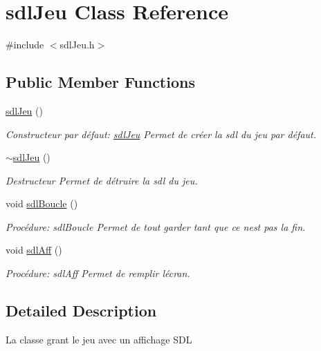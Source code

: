 \hypertarget{classsdlJeu}{}\section{sdl\+Jeu Class Reference}
\label{classsdlJeu}


{\ttfamily \#include $<$sdl\+Jeu.\+h$>$}

\subsection*{Public Member Functions}
\begin{DoxyCompactItemize}
\item 
\hyperlink{classsdlJeu_a06ba2075a4b592f6d0a2e268c29a044e}{sdl\+Jeu} ()
\begin{DoxyCompactList}\small\item\em Constructeur par défaut\+: \hyperlink{classsdlJeu}{sdl\+Jeu} Permet de créer la sdl du jeu par défaut. \end{DoxyCompactList}\item 
\mbox{\label{classsdlJeu_a5bcd8f5ed17a2cea2ad2fc633415cbcc}} 
\hyperlink{classsdlJeu_a5bcd8f5ed17a2cea2ad2fc633415cbcc}{$\sim$sdl\+Jeu} ()
\begin{DoxyCompactList}\small\item\em Destructeur Permet de détruire la sdl du jeu. \end{DoxyCompactList}\item 
void \hyperlink{classsdlJeu_a5628835d7efcab056985c3aa3de56836}{sdl\+Boucle} ()
\begin{DoxyCompactList}\small\item\em Procédure\+: sdl\+Boucle Permet de tout garder tant que ce n\textquotesingle{}est pas la fin. \end{DoxyCompactList}\item 
void \hyperlink{classsdlJeu_aedada55e3f96ba37493664d358dc7b60}{sdl\+Aff} ()
\begin{DoxyCompactList}\small\item\em Procédure\+: sdl\+Aff Permet de remplir l\textquotesingle{}écran. \end{DoxyCompactList}\end{DoxyCompactItemize}


\subsection{Detailed Description}
La classe grant le jeu avec un affichage S\+DL 

